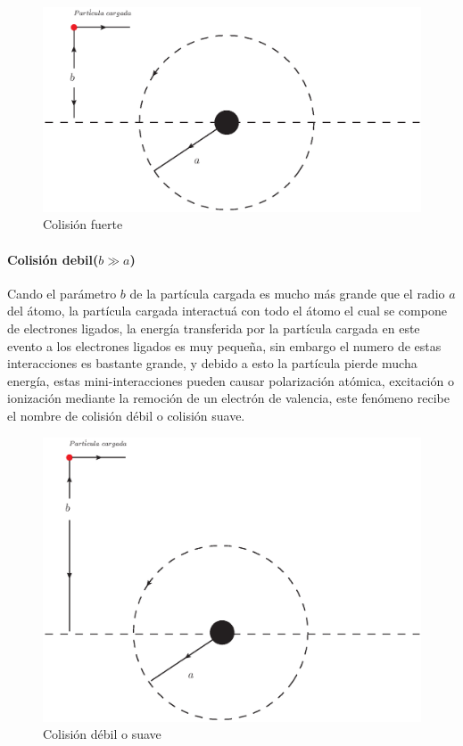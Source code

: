 \begin{figure}[htbp]
   \centering
   \includegraphics[width=.65\linewidth]{./Figures/hardcoli.eps}
   \caption{Colisión fuerte}
   \label{fig:cf}
\end{figure}

\paragraph{Colisión debil($b\gg a$)}
Cando el parámetro $b$ de la partícula cargada es mucho más grande que el radio $a$ del átomo, la partícula cargada interactuá con todo el átomo el cual se compone de electrones ligados, la energía transferida por la partícula cargada en este evento a los electrones ligados es muy pequeña, sin embargo el numero de estas interacciones es bastante grande, y debido a esto la partícula pierde mucha energía, estas mini-interacciones pueden causar polarización atómica, excitación o ionización mediante la remoción de un electrón de valencia, este fenómeno recibe el nombre de colisión débil o colisión suave\cite{Podgorsak}.

\begin{figure}[htbp]
   \centering
   \includegraphics[width=.65\linewidth]{./Figures/softcoli.eps}
   \caption{Colisión débil o suave}
   \label{fig:cd}
\end{figure}
